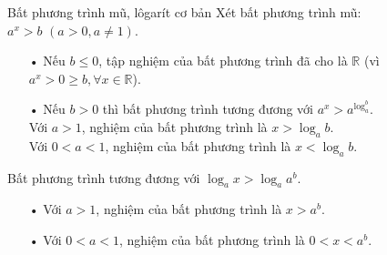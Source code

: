 \begin{dang}{Bất phương trình mũ, lôgarít cơ bản}
	Xét bất phương trình mũ: $a^x>b\, \, (a>0, a\neq 1)$.
	\begin{itemize}
		\item[•] Nếu $b\leq 0$, tập nghiệm của bất phương trình đã cho là $\mathbb{R}$ (vì $a^x>0\geq b, \forall x\in \mathbb{R}$).
		\item[•] Nếu $b>0$ thì bất phương trình tương đương với $a^x>a^{\log_a^b}$.\\
		Với $a>1$, nghiệm của bất phương trình là $x>\log_a b$.\\
		Với $0<a<1$, nghiệm của bất phương trình là $x<\log_a b$.		
	\end{itemize}
	Bất phương trình tương đương với $\log_a x>\log_a a^b$.
	\begin{itemize}
		\item[•] Với $a>1$, nghiệm của bất phương trình là $x>a^b$.
		\item[•] Với $0<a<1$, nghiệm của bất phương trình là $0<x<a^b$.
	\end{itemize}
\end{dang}
